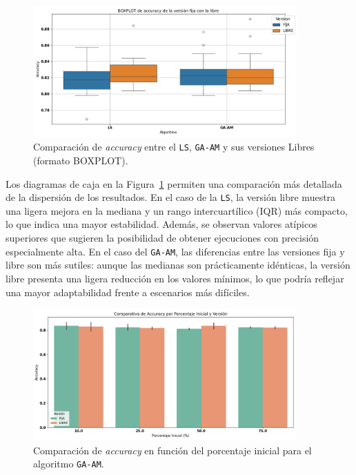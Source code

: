 \begin{figure}[htp]
  \centering
  \includegraphics[width=0.9\textwidth]{imagenes/evaluaciones/libres/boxplot_por_algoritmo.png}
  \caption{Comparación de \textit{accuracy} entre el \texttt{LS}, \texttt{GA-AM} y sus versiones Libres (formato BOXPLOT).}
  \label{fig:boxplot_por_algoritmo-libres}
\end{figure}

Los diagramas de caja en la Figura~\ref{fig:boxplot_por_algoritmo-libres} permiten una comparación más detallada de la dispersión de los resultados.
En el caso de la \texttt{LS}, la versión libre muestra una ligera mejora en la mediana y un rango intercuartílico (IQR) más compacto, lo que indica una mayor estabilidad.
Además, se observan valores atípicos superiores que sugieren la posibilidad de obtener ejecuciones con precisión especialmente alta.
En el caso del \texttt{GA-AM}, las diferencias entre las versiones fija y libre son más sutiles: aunque las medianas son prácticamente idénticas,
la versión libre presenta una ligera reducción en los valores mínimos, lo que podría reflejar una mayor adaptabilidad frente a escenarios más difíciles.


\begin{figure}[htp]
  \centering
  \includegraphics[width=0.9\textwidth]{imagenes/evaluaciones/libres/am_por_pi.png}
  \caption{Comparación de \textit{accuracy} en función del porcentaje inicial para el algoritmo \texttt{GA-AM}.}
  \label{fig:am_por_pi}
\end{figure}

